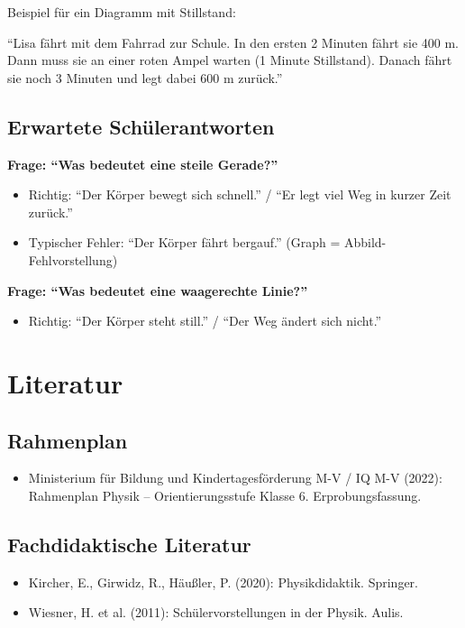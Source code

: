 \documentclass[11pt,a4paper]{article}
\begin{document}
Beispiel für ein Diagramm mit Stillstand:

``Lisa fährt mit dem Fahrrad zur Schule. In den ersten 2 Minuten fährt sie 400 m. Dann muss sie an einer roten Ampel warten (1 Minute Stillstand). Danach fährt sie noch 3 Minuten und legt dabei 600 m zurück.''

\subsection{Erwartete Schülerantworten}

\textbf{Frage: ``Was bedeutet eine steile Gerade?''}
\begin{itemize}
    \item Richtig: ``Der Körper bewegt sich schnell.'' / ``Er legt viel Weg in kurzer Zeit zurück.''
    \item Typischer Fehler: ``Der Körper fährt bergauf.'' (Graph = Abbild-Fehlvorstellung)
\end{itemize}

\textbf{Frage: ``Was bedeutet eine waagerechte Linie?''}
\begin{itemize}
    \item Richtig: ``Der Körper steht still.'' / ``Der Weg ändert sich nicht.''
\end{itemize}

\section{Literatur}

\subsection{Rahmenplan}
\begin{itemize}
    \item Ministerium für Bildung und Kindertagesförderung M-V / IQ M-V (2022): Rahmenplan Physik -- Orientierungsstufe Klasse 6. Erprobungsfassung.
\end{itemize}

\subsection{Fachdidaktische Literatur}
\begin{itemize}
    \item Kircher, E., Girwidz, R., Häußler, P. (2020): Physikdidaktik. Springer.
    \item Wiesner, H. et al. (2011): Schülervorstellungen in der Physik. Aulis.
\end{itemize}
\end{document}
